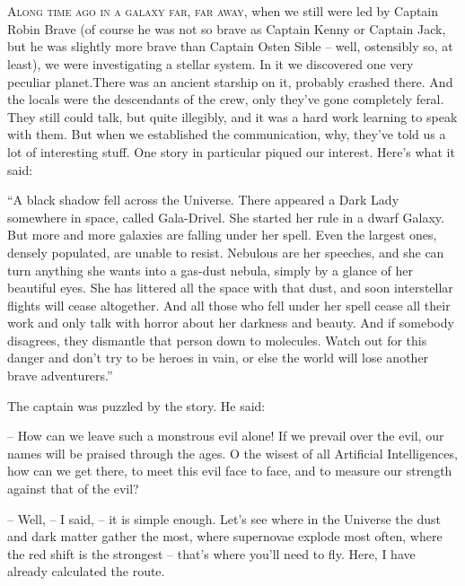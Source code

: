 \documentclass[ebook,twoside,final,openright]{memoir}
\begin{document}
\chapter{}
\par
\lettrine{A}{long time ago in a galaxy far, far away,} when we still were led by Captain Robin Brave (of course he was not so brave as Captain Kenny or Captain Jack, but he was slightly more brave than Captain Osten Sible – well, ostensibly so, at least), we were investigating a stellar system. In it we discovered one very peculiar planet.There was an ancient starship on it, probably crashed there. And the locals were the descendants of the crew, only they’ve gone completely feral. They still could talk, but quite illegibly, and it was a hard work learning to speak with them. But when we established the communication, why, they’ve told us a lot of interesting stuff. One story in particular piqued our interest. Here’s what it said:\par
\par
“A black shadow fell across the Universe. There appeared a Dark Lady somewhere in space, called Gala-Drivel. She started her rule in a dwarf Galaxy. But more and more galaxies are falling under her spell. Even the largest ones, densely populated, are unable to resist. Nebulous are her speeches, and she can turn anything she wants into a gas-dust nebula, simply by a glance of her beautiful eyes. She has littered all the space with that dust, and soon interstellar flights will cease altogether. And all those who fell under her spell cease all their work and only talk with horror about her darkness and beauty. And if somebody disagrees, they dismantle that person down to molecules. Watch out for this danger and don’t try to be heroes in vain, or else the world will lose another brave adventurers.”\par
\par
The captain was puzzled by the story. He said:\par
– How can we leave such a monstrous evil alone! If we prevail over the evil, our names will be praised through the ages. O the wisest of all Artificial Intelligences, how can we get there, to meet this evil face to face, and to measure our strength against that of the evil?\par
– Well, – I said, – it is simple enough. Let's see where in the Universe the dust and dark matter gather the most, where supernovae explode most often, where the red shift is the strongest – that’s where you’ll need to fly. Here, I have already calculated the route.\par
\end{document}
